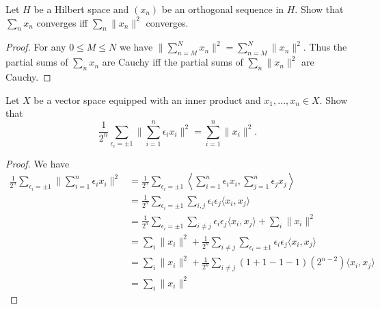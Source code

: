\documentclass{article}
\begin{document}
 Let $H$ be a Hilbert space and $(x_n)$ be an orthogonal sequence in $H$. Show that $\sum_n x_n$ converges iff $\sum_n \|x_n\|^2$ converges. 
\begin{proof}
For any $0 \le M \le N$ we have $\|\sum_{n=M}^N x_n \|^2 = \sum_{n=M}^N \|x_n\|^2$.  Thus the partial sums of $\sum_n x_n$ are Cauchy iff the partial sums of $\sum_n \|x_n\|^2$ are Cauchy.
\end{proof}


 Let $X$ be a vector space equipped with an inner product and $x_1, \ldots, x_n \in X$. Show that
$$ \frac 1 {2^n} \sum_{\epsilon_i = \pm 1} \| \sum_{i=1}^n \epsilon_i x_i \|^2 = \sum_{i=1}^n \|x_i\|^2.$$
\begin{proof}
We have
\begin{align*}
\frac 1 {2^n} \sum_{\epsilon_i = \pm 1} \| \sum_{i=1}^n \epsilon_i x_i \|^2 
& = \frac 1 {2^n} \sum_{\epsilon_i = \pm 1} \left \langle \sum_{i=1}^n \epsilon_i x_i,  \sum_{j=1}^n \epsilon_j x_j \right \rangle
\\ & = \frac 1 {2^n} \sum_{\epsilon_i = \pm 1} \sum_{i,j} \epsilon_i \epsilon_j \langle x_i, x_j \rangle
\\ & = \frac 1 {2^n} \sum_{\epsilon_i = \pm 1} \sum_{i \neq j} \epsilon_i \epsilon_j \langle x_i, x_j \rangle + \sum_i \|x_i\|^2
\\ & = \sum_i \|x_i\|^2 + \frac 1 {2^n}  \sum_{i \neq j} \sum_{\epsilon_i = \pm 1} \epsilon_i \epsilon_j \langle x_i, x_j \rangle
\\ & = \sum_i \|x_i\|^2 + \frac 1 {2^n}  \sum_{i \neq j} (1 + 1 -1 -1) (2^{n-2}) \langle x_i, x_j \rangle
\\ & = \sum_i \|x_i\|^2 
\end{align*}

\end{proof}
\end{document}
